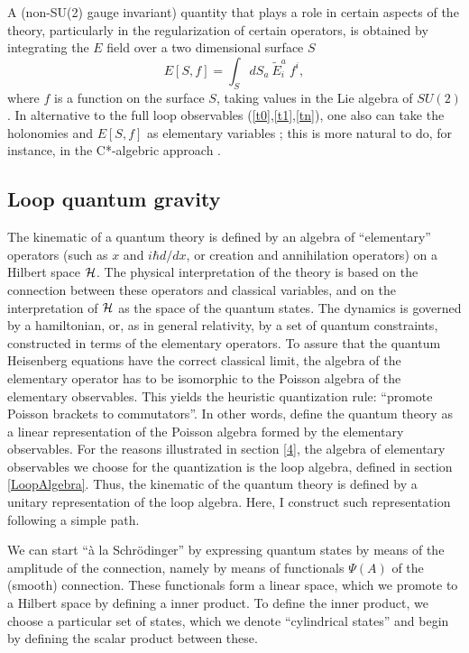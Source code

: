 A (non-SU(2) gauge invariant) quantity that plays a role in 
certain aspects of the theory, particularly in the regularization 
of certain operators, is obtained by integrating the $E$ field 
over a two dimensional surface $S$ 
\begin{equation}
	E[S,f] = \int_{S} dS_{a}\ \tilde{E}^{a}_{i}\ f^{i}, 
\end{equation}
where $f$ is a function on the surface $S$, taking values in the 
Lie algebra of $SU(2)$.  In alternative to the full loop 
observables (\ref{t0},\ref{t1},\ref{tn}), one also can take the 
holonomies and $E[S,f]$ as elementary variables 
\cite{AshtekarLewandowski3,AshtekarLewandowskiArea2}; this is 
more natural to do, for instance, in the C*-algebric approach 
\cite{AshtekarIsham}.

\subsection{Loop quantum gravity} \label{hilbertspace}

The kinematic of a quantum theory is defined by an algebra of 
``elementary'' operators (such as $x$ and $i\hbar d/dx$, or 
creation and annihilation operators) on a Hilbert space $\cal H$.  
The physical interpretation of the theory is based on the 
connection between these operators and classical variables, and 
on the interpretation of $\cal H$ as the space of the quantum 
states.  The dynamics is governed by a hamiltonian, or, as in 
general relativity, by a set of quantum constraints, constructed 
in terms of the elementary operators.  To assure that the quantum 
Heisenberg equations have the correct classical limit, the 
algebra of the elementary operator has to be isomorphic to the 
Poisson algebra of the elementary observables.  This yields the 
heuristic quantization rule: ``promote Poisson brackets to 
commutators''.  In other words, define the quantum theory as a 
linear representation of the Poisson algebra formed by the 
elementary observables.  For the reasons illustrated in section 
\ref{4}, the algebra of elementary observables we choose for the 
quantization is the loop algebra, defined in section 
\ref{LoopAlgebra}.  Thus, the kinematic of the quantum theory is 
defined by a unitary representation of the loop algebra.  Here, I 
construct such representation following a simple path.

We can start ``\`{a} la Schr\"odinger'' by expressing quantum 
states by means of the amplitude of the connection, namely by 
means of functionals $\Psi(A)$ of the (smooth) connection.  These 
functionals form a linear space, which we promote to a Hilbert 
space by defining a inner product.  To define the inner product, 
we choose a particular set of states, which we denote 
``cylindrical states'' and begin by defining the 
scalar product between these.   

